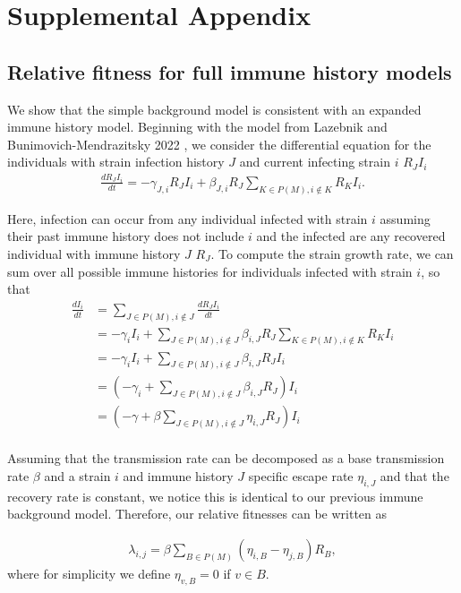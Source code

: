 \documentclass[12pt,oneside,letterpaper]{article}
\begin{document}
\section*{Supplemental Appendix}

\subsection{Relative fitness for full immune history models}\label{ssec:full_immune_history}


We show that the simple background model is consistent with an expanded immune history model. 
Beginning with the model from Lazebnik and Bunimovich-Mendrazitsky 2022 \cite{Lazebnik2022}, we consider the differential equation for the individuals with strain infection history $J$ and current infecting strain $i$ $R_{J}I_{i}$
\begin{align*}
\frac{dR_{J} I_{i}}{dt} = - \gamma_{J, i} R_{J} I_{i} + \beta_{J, i} R_{J} \sum_{K \in P(M), i\notin K} R_{K}I_{i}.
\end{align*}

Here, infection can occur from any individual infected with strain $i$ assuming their past immune history does not include $i$ and the infected are any recovered individual with immune history $J$  $R_{J}$.
To compute the strain growth rate, we can sum over all possible immune histories for individuals infected with strain $i$, so that
\begin{align*}
    \frac{d I_{i}}{d t} &= \sum_{J \in P(M), i \notin J} \frac{dR_{J} I_{i}}{dt} \\
                        &= - \gamma_{i} I_{i} + \sum_{J \in P(M), i \notin J} \beta_{i, J} R_{J} \sum_{K \in P(M), i\notin K} R_{K}I_{i}\\
                        &= - \gamma_{i} I_{i} + \sum_{J \in P(M), i \notin J} \beta_{i, J} R_{J} I_{i}\\
                        &= \left(-\gamma_{i} + \sum_{J \in P(M), i \notin J} \beta_{i,J} R_{J} \right) I_{i}\\
                        &= \left(-\gamma + \beta\sum_{J \in P(M), i \notin J} \eta_{i,J} R_{J} \right) I_{i}\\
\end{align*}

Assuming that the transmission rate can be decomposed as a base transmission rate $\beta$ and a strain $i$ and immune history $J$ specific escape rate $\eta_{i, J}$ and that the recovery rate is constant, we notice this is identical to our previous immune background model.
Therefore, our relative fitnesses can be written as

\begin{align*}
    \lambda_{i, j} = \beta \sum_{B \in P(M)} (\eta_{i, B} - \eta_{j, B}) R_{B},
\end{align*}
where for simplicity we define $\eta_{v, B} = 0$ if $v \in B$.
\end{document}
